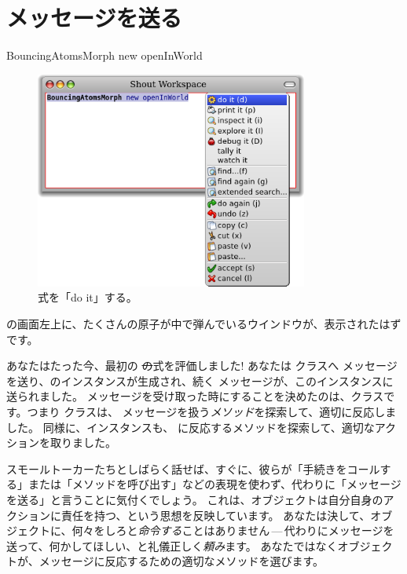 \documentclass[a4paper,10pt,twoside]{book}
\begin{document}
\section{メッセージを送る}


\begin{code}{}
BouncingAtomsMorph new openInWorld
\end{code}


\begin{figure}[htb]
\centerline {\includegraphics[width=0.8\textwidth]{Doit}}
\caption{式を「do it」する。}
\end{figure}

\pharo の画面左上に、たくさんの原子が中で弾んでいるウインドウが、表示されたはずです。

あなたはたった今、最初の \st の式を評価しました!
あなたは \bam クラスへ  メッセージを送り、\bam のインスタンスが生成され、続く  メッセージが、このインスタンスに送られました。
 メッセージを受け取った時にすることを決めたのは、\bam クラスです。つまり \bam クラスは、 メッセージを扱う\emph{メソッド}を探索して、適切に反応しました。
同様に、\bam インスタンスも、 に反応するメソッドを探索して、適切なアクションを取りました。

スモールトーカーたちとしばらく話せば、すぐに、彼らが「手続きをコールする」または「メソッドを呼び出す」などの表現を使わず、代わりに「メッセージを送る」と言うことに気付くでしょう。
これは、オブジェクトは自分自身のアクションに責任を持つ、という思想を反映しています。
あなたは決して、オブジェクトに、何々をしろと\emph{命令する}ことはありません\,---\,代わりにメッセージを送って、何かしてほしい、と礼儀正しく\emph{頼み}ます。
あなたではなくオブジェクトが、メッセージに反応するための適切なメソッドを選びます。
\end{document}
